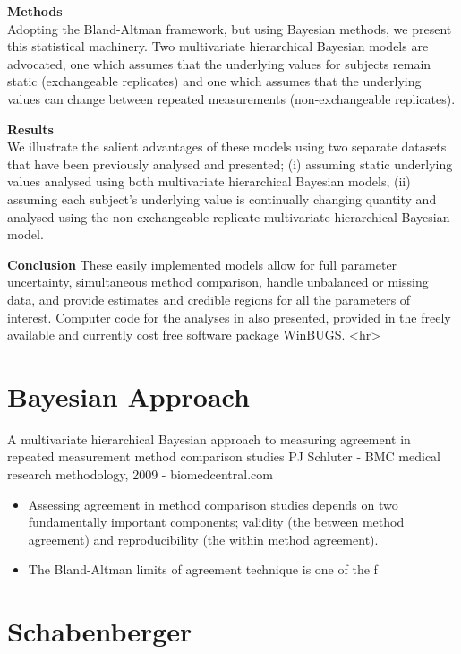 \documentclass[12pt, a4paper]{report}
\theoremstyle{plain}
\theoremstyle{definition}
\theoremstyle{remark}
\begin{document}
\textbf{Methods}\\
Adopting the Bland-Altman framework, but using Bayesian methods, we present this statistical machinery. Two multivariate hierarchical Bayesian models are advocated, one which assumes that the underlying values for subjects remain static (exchangeable replicates) and one which assumes that the underlying values can change between repeated measurements (non-exchangeable replicates).

\textbf{Results}\\
We illustrate the salient advantages of these models using two separate datasets that have been previously analysed and presented; 
(i) assuming static underlying values analysed using both multivariate hierarchical Bayesian models,  
(ii) assuming each subject's underlying value is continually changing quantity and analysed using the non-exchangeable replicate multivariate hierarchical Bayesian model.  

\textbf{Conclusion}
These easily implemented models allow for full parameter uncertainty, simultaneous method comparison, handle unbalanced or missing data, and provide estimates and credible regions for all the parameters of interest. Computer code for the analyses in also presented, provided in the freely available and currently cost free software package WinBUGS.
<hr>

\section*{Bayesian Approach}
A multivariate hierarchical Bayesian approach to measuring agreement in repeated measurement method comparison studies
PJ Schluter - BMC medical research methodology, 2009 - biomedcentral.com

\begin{itemize}
	\item Assessing agreement in method comparison studies depends on two fundamentally important 
	components; validity (the between method agreement) and reproducibility (the within method 
	agreement). 
	\item The Bland-Altman limits of agreement technique is one of the f
\end{itemize}



\section{Schabenberger}
\end{document}
